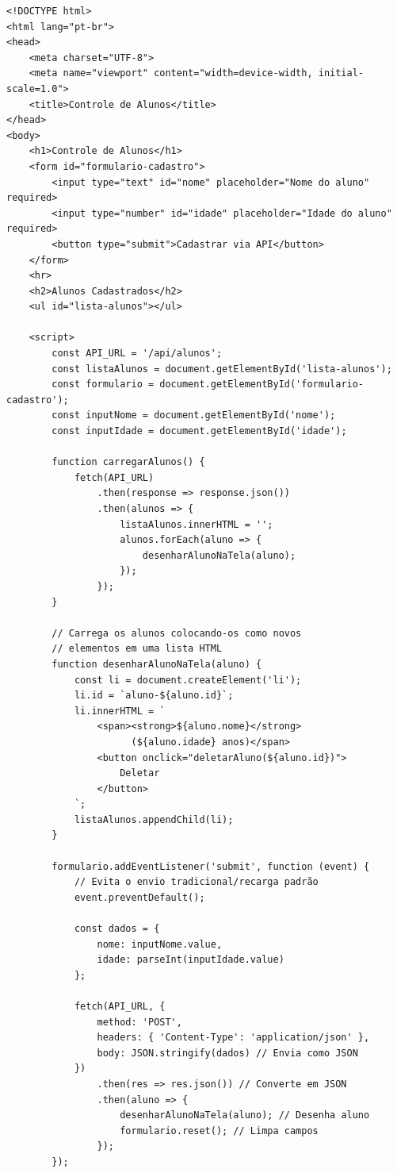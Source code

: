 \documentclass[12pt,a4paper]{article}
\begin{document}
\begin{boxCodigo}
\begin{verbatim}
<!DOCTYPE html>
<html lang="pt-br">
<head>
    <meta charset="UTF-8">
    <meta name="viewport" content="width=device-width, initial-scale=1.0">
    <title>Controle de Alunos</title>
</head>
<body>
    <h1>Controle de Alunos</h1>
    <form id="formulario-cadastro">
        <input type="text" id="nome" placeholder="Nome do aluno" required>
        <input type="number" id="idade" placeholder="Idade do aluno" required>
        <button type="submit">Cadastrar via API</button>
    </form>
    <hr>
    <h2>Alunos Cadastrados</h2>
    <ul id="lista-alunos"></ul>

    <script>
        const API_URL = '/api/alunos';
        const listaAlunos = document.getElementById('lista-alunos');
        const formulario = document.getElementById('formulario-cadastro');
        const inputNome = document.getElementById('nome');
        const inputIdade = document.getElementById('idade');

        function carregarAlunos() {
            fetch(API_URL)
                .then(response => response.json())
                .then(alunos => {
                    listaAlunos.innerHTML = '';
                    alunos.forEach(aluno => {
                        desenharAlunoNaTela(aluno);
                    });
                });
        }

        // Carrega os alunos colocando-os como novos
        // elementos em uma lista HTML
        function desenharAlunoNaTela(aluno) {
            const li = document.createElement('li');
            li.id = `aluno-${aluno.id}`;
            li.innerHTML = `
                <span><strong>${aluno.nome}</strong> 
                      (${aluno.idade} anos)</span> 
                <button onclick="deletarAluno(${aluno.id})">
                    Deletar
                </button>
            `;
            listaAlunos.appendChild(li);
        }

        formulario.addEventListener('submit', function (event) {
            // Evita o envio tradicional/recarga padrão
            event.preventDefault();
            
            const dados = { 
                nome: inputNome.value, 
                idade: parseInt(inputIdade.value) 
            };
            
            fetch(API_URL, {
                method: 'POST',
                headers: { 'Content-Type': 'application/json' },
                body: JSON.stringify(dados) // Envia como JSON
            })
                .then(res => res.json()) // Converte em JSON
                .then(aluno => {
                    desenharAlunoNaTela(aluno); // Desenha aluno
                    formulario.reset(); // Limpa campos
                });
        });


\end{verbatim}
\end{boxCodigo}
\end{document}

